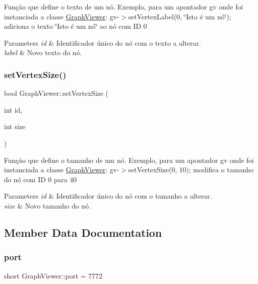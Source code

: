 Função que define o texto de um nó. Exemplo, para um apontador gv onde foi instanciada a classe \hyperlink{class_graph_viewer}{Graph\+Viewer}\+: gv-\/$>$set\+Vertex\+Label(0, \char`\"{}\+Isto é um nó\char`\"{}); adiciona o texto \char`\"{}\+Isto é um nó\char`\"{} ao nó com ID 0


\begin{DoxyParams}{Parameters}
{\em id} & Identificador único do nó com o texto a alterar. \\
\hline
{\em label} & Novo texto do nó. \\
\hline
\end{DoxyParams}
\mbox{\label{class_graph_viewer_ae930dfdfcdeb7a871eefb6028d74b9f9}} 
\subsubsection{\texorpdfstring{set\+Vertex\+Size()}{setVertexSize()}}
{\footnotesize\ttfamily bool Graph\+Viewer\+::set\+Vertex\+Size (\begin{DoxyParamCaption}\item[{int}]{id,  }\item[{int}]{size }\end{DoxyParamCaption})}

Função que define o tamanho de um nó. Exemplo, para um apontador gv onde foi instanciada a classe \hyperlink{class_graph_viewer}{Graph\+Viewer}\+: gv-\/$>$set\+Vertex\+Size(0, 10); modifica o tamanho do nó com ID 0 para 40


\begin{DoxyParams}{Parameters}
{\em id} & Identificador único do nó com o tamanho a alterar. \\
\hline
{\em size} & Novo tamanho do nó. \\
\hline
\end{DoxyParams}


\subsection{Member Data Documentation}
\mbox{\label{class_graph_viewer_a89d0abe75f41feededc49497cc514342}} 
\subsubsection{\texorpdfstring{port}{port}}
{\footnotesize\ttfamily short Graph\+Viewer\+::port = 7772\hspace{0.3cm}{\ttfamily [static]}}

